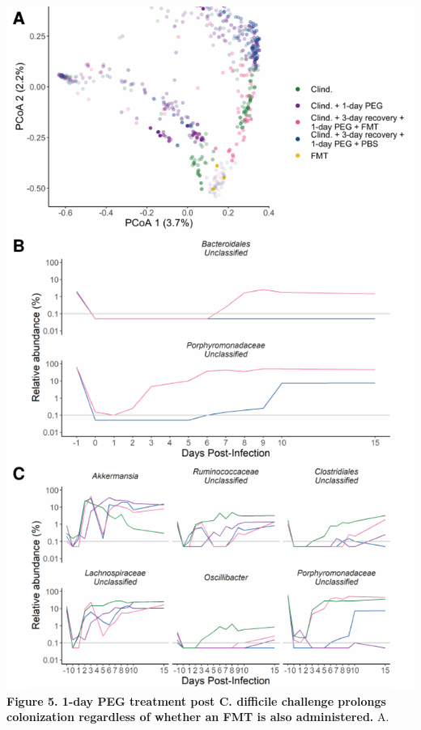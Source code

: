 \documentclass[
  11pt,
]{article}
\begin{document}
\includegraphics{figure_5_16S.pdf} \textbf{Figure 5. 1-day PEG treatment
post C. difficile challenge prolongs colonization regardless of whether
an FMT is also administered.} A. \newpage
\end{document}
